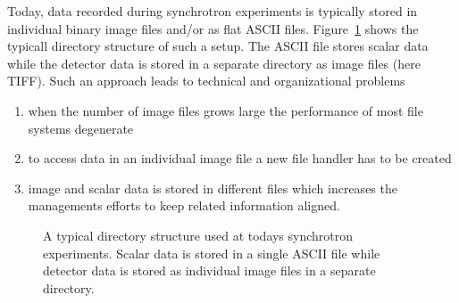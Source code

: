 
Today, data recorded during synchrotron experiments is typically stored in
individual binary image files and/or as flat ASCII files. 
Figure~\ref{fig:nxintro:old_fstree} shows the typicall directory structure of
such a setup. The ASCII file stores scalar data while the detector data is
stored in a separate directory as image files (here TIFF).
Such an approach leads to technical and organizational problems
\begin{enumerate}
\item when the number of image files grows large the performance of most file
systems degenerate 
\item to access data in an individual image file a new file handler has to be
created 
\item image and scalar data is stored in different files which increases the
managements efforts to keep related information aligned.
\end{enumerate}
\begin{figure}[tb]
    \centering
    \begin{minipage}[c]{0.5\linewidth}
    \centering
    \end{minipage}
    \hfill
    \begin{minipage}[c]{0.48\linewidth}
    \caption{{\small A typical directory structure used at todays synchrotron
    experiments. Scalar data is stored in a single ASCII file while detector
    data is stored as individual image files in a separate directory.}}
    \label{fig:nxintro:old_fstree}
    \end{minipage}
\end{figure}

